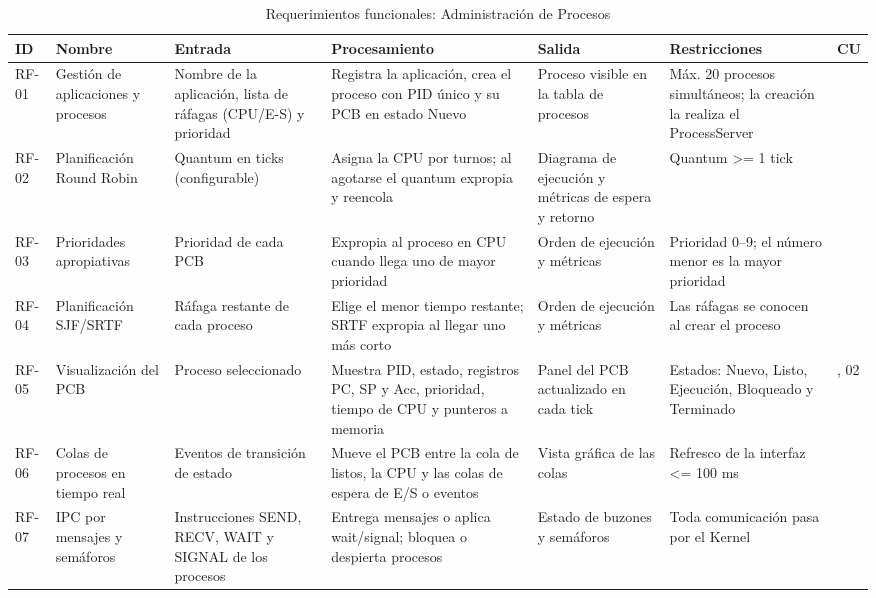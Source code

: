\documentclass[conference]{IEEEtran}
\begin{document}
\begin{table}[!t]
\caption{Requerimientos funcionales: Administración de Procesos}
\label{tab:rf-procesos}
\footnotesize\renewcommand{\arraystretch}{1.1}\setlength{\tabcolsep}{2pt}
\begin{tabular}{|>{\raggedright\arraybackslash}p{0.95cm}|>{\raggedright\arraybackslash}p{2.3cm}|>{\raggedright\arraybackslash}p{3.2cm}|>{\raggedright\arraybackslash}p{3.9cm}|>{\raggedright\arraybackslash}p{2.8cm}|>{\raggedright\arraybackslash}p{2.8cm}|>{\raggedright\arraybackslash}p{0.95cm}|}
\hline
\textbf{ID} & \textbf{Nombre} & \textbf{Entrada} & \textbf{Procesamiento} & \textbf{Salida} & \textbf{Restricciones} & \textbf{CU}\\ \hline
RF-01 & Gestión de aplicaciones y procesos & Nombre de la aplicación, lista de ráfagas (CPU/E-S) y prioridad & Registra la aplicación, crea el proceso con PID único y su PCB en estado Nuevo & Proceso visible en la tabla de procesos & Máx. 20 procesos simultáneos; la creación la realiza el ProcessServer & 01\\ \hline
RF-02 & Planificación Round Robin & Quantum en ticks (configurable) & Asigna la CPU por turnos; al agotarse el quantum expropia y reencola & Diagrama de ejecución y métricas de espera y retorno & Quantum \textgreater{}= 1 tick & 02\\ \hline
RF-03 & Prioridades apropiativas & Prioridad de cada PCB & Expropia al proceso en CPU cuando llega uno de mayor prioridad & Orden de ejecución y métricas & Prioridad 0–9; el número menor es la mayor prioridad & 02\\ \hline
RF-04 & Planificación SJF/SRTF & Ráfaga restante de cada proceso & Elige el menor tiempo restante; SRTF expropia al llegar uno más corto & Orden de ejecución y métricas & Las ráfagas se conocen al crear el proceso & 02\\ \hline
RF-05 & Visualización del PCB & Proceso seleccionado & Muestra PID, estado, registros PC, SP y Acc, prioridad, tiempo de CPU y punteros a memoria & Panel del PCB actualizado en cada tick & Estados: Nuevo, Listo, Ejecución, Bloqueado y Terminado & 01, 02\\ \hline
RF-06 & Colas de procesos en tiempo real & Eventos de transición de estado & Mueve el PCB entre la cola de listos, la CPU y las colas de espera de E/S o eventos & Vista gráfica de las colas & Refresco de la interfaz \textless{}= 100 ms & 02\\ \hline
RF-07 & IPC por mensajes y semáforos & Instrucciones SEND, RECV, WAIT y SIGNAL de los procesos & Entrega mensajes o aplica wait/signal; bloquea o despierta procesos & Estado de buzones y semáforos & Toda comunicación pasa por el Kernel & 03\\ \hline

\end{tabular}
\end{table}
\end{document}
